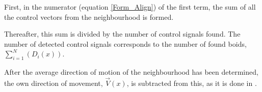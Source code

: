 \documentclass[a4paper, 10pt, journal]{wissarbIEEE}      %
\begin{document}
First, in the numerator (equation \ref{Form_Align}) of the first term, the sum of all the control vectors from the neighbourhood is formed. 


Thereafter, this sum is divided by the number of control signals found. The number of detected control signals corresponds to the number of found boids, $\sum_{i=1}^N(D_i(x))$.

After the average direction of motion of the neighbourhood has been determined, the own direction of movement, $\vec{V}(x)$, is subtracted from this, as it is done in \cite{Reynolds99steeringbehaviors}.







\end{document}
